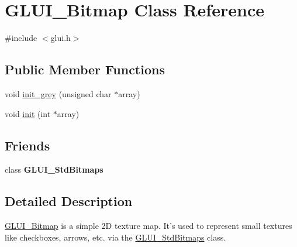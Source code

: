\hypertarget{class_g_l_u_i___bitmap}{\section{G\+L\+U\+I\+\_\+\+Bitmap Class Reference}
\label{class_g_l_u_i___bitmap}
}


{\ttfamily \#include $<$glui.\+h$>$}

\subsection*{Public Member Functions}
\begin{DoxyCompactItemize}
\item 
void \hyperlink{class_g_l_u_i___bitmap_a329b8c9e64d0a5df4d1cc657ed379075}{init\+\_\+grey} (unsigned char $\ast$array)
\item 
void \hyperlink{class_g_l_u_i___bitmap_aac85d978c45e38395bbf504ad8abd9a9}{init} (int $\ast$array)
\end{DoxyCompactItemize}
\subsection*{Friends}
\begin{DoxyCompactItemize}
\item 
\hypertarget{class_g_l_u_i___bitmap_aa9d1e2d4b5b5b9d0c2512496f768ecf4}{class {\bfseries G\+L\+U\+I\+\_\+\+Std\+Bitmaps}}\label{class_g_l_u_i___bitmap_aa9d1e2d4b5b5b9d0c2512496f768ecf4}

\end{DoxyCompactItemize}


\subsection{Detailed Description}
\hyperlink{class_g_l_u_i___bitmap}{G\+L\+U\+I\+\_\+\+Bitmap} is a simple 2\+D texture map. It's used to represent small textures like checkboxes, arrows, etc. via the \hyperlink{class_g_l_u_i___std_bitmaps}{G\+L\+U\+I\+\_\+\+Std\+Bitmaps} class. 

